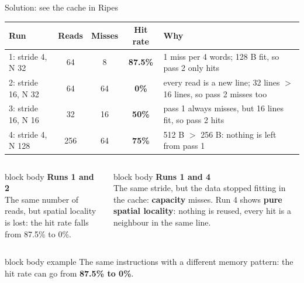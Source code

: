 \documentclass[aspectratio=169,10pt]{beamer}
\newcommand{\stepbox}[2]{%
  \begin{beamercolorbox}[rounded=true,sep=0.09cm,wd=\linewidth]{block body}
    \footnotesize\textbf{#1}\\ #2
  \end{beamercolorbox}\vspace{0.06cm}}
\newcommand{\keymsg}[1]{%
  \begin{beamercolorbox}[rounded=true,sep=0.1cm,wd=\textwidth]{block body example}
    \centering\footnotesize #1
  \end{beamercolorbox}}
\begin{document}
\begin{frame}{Solution: see the cache in Ripes}
  \begin{center}
    \scriptsize
    \renewcommand{\arraystretch}{1.2}
    \begin{tabular}{lcccl}
      \toprule
      \textbf{Run} & \textbf{Reads} & \textbf{Misses} & \textbf{Hit rate} & \textbf{Why} \\
      \midrule
      1: stride 4, N 32   & 64  & 8  & \textbf{87.5\%} & 1 miss per 4 words; 128 B fit, so pass 2 only hits \\
      2: stride 16, N 32  & 64  & 64 & \textbf{0\%}    & every read is a new line; 32 lines $>$ 16 lines, so pass 2 misses too \\
      3: stride 16, N 16  & 32  & 16 & \textbf{50\%}   & pass 1 always misses, but 16 lines fit, so pass 2 hits \\
      4: stride 4, N 128  & 256 & 64 & \textbf{75\%}   & 512 B $>$ 256 B: nothing is left from pass 1 \\
      \bottomrule
    \end{tabular}
  \end{center}
  \vspace{0.05cm}
  \begin{columns}[T,onlytextwidth]
      \stepbox{Runs 1 and 2}{The same number of reads, but spatial locality is lost: the hit rate falls from 87.5\% to 0\%.}
      \stepbox{Runs 1 and 4}{The same stride, but the data stopped fitting in the cache: \textbf{capacity} misses. Run 4 shows \textbf{pure spatial locality}: nothing is reused, every hit is a neighbour in the same line.}
  \end{columns}
  \vfill
  \keymsg{The same instructions with a different memory pattern: the hit rate can go from \textbf{87.5\% to 0\%}.}
\end{frame}
\end{document}
